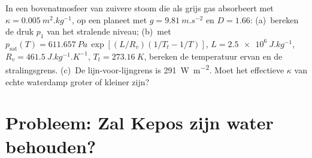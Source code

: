 \begin{exercise}[$\star\star\star$]\label{exo:b3:planetary-atmospheres:12}
In een bovenatmosfeer van zuivere stoom die als grijs gas absorbeert met $\kappa =
\qty{0.005}{m^2.kg^{-1}}$, op een planeet met $g = \qty{9.81}{m.s^{-2}}$
en $D = 1.66$: (a)~bereken de druk $p_1$ van het stralende niveau;
(b)~met $p_\mathrm{sat}(T) = \qty{611.657}{Pa}\,\exp[(L/R_v)(1/T_t -
1/T)]$, $L = \qty{2.5e6}{J.kg^{-1}}$, $R_v = \qty{461.5}{J.kg^{-1}.K^{-1}}$,
$T_t = \qty{273.16}{K}$, bereken de temperatuur ervan en de stralingsgrens.
(c)~De lijn-voor-lijngrens is \qty{291}{W.m^{-2}}. Moet het effectieve
$\kappa$ van echte waterdamp groter of kleiner zijn?
\end{exercise}

\section{Probleem: Zal Kepos zijn water behouden?}

